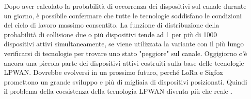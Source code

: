 \documentclass[a4paper]{report} %
\begin{document}
Dopo aver calcolato la probabilità di occorrenza dei dispositivi sul canale durante un giorno, è possibile confermare che tutte le tecnologie soddisfano le condizioni del ciclo di lavoro massimo consentito. La funzione di distribuzione della probabilità di collisione due o più dispositivi tende ad 1 per più di 1000 dispositivi attivi simultaneamente, se viene utilizzata la variante con il più lungo verificarsi di tecnologie per trovare uno stato "peggiore" sul canale. Oggigiorno c'è ancora una piccola parte dei dispositivi attivi costruiti sulla base delle tecnologie LPWAN. Dovrebbe evolversi in un prossimo futuro, perché LoRa e Sigfox promettono un grande sviluppo e più di migliaia di dispositivi posizionati. Quindi il problema della coesistenza della tecnologia LPWAN diventa più che reale \cite{art:rif.46}.
\end{document}
